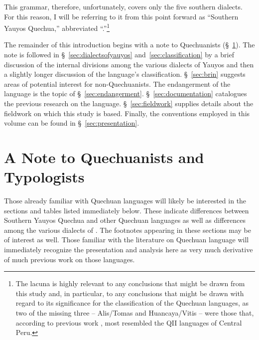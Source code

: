 This grammar, therefore, unfortunately, covers only the five southern dialects. For this reason, I will be referring to it from this point forward as ``Southern Yauyos Quechua,'' abbreviated ``\SYQ{}.''\footnote{The lacuna is highly relevant to any conclusions that might be drawn from this study and, in particular, to any conclusions that might be drawn with regard to its significance for the classification of the Quechuan languages, as two of the missing three -- Alis/Tomas and Huancaya/Vitis -- were those that, according to previous work \citep{Taylor94a,Taylor00}, most resembled the QII languages of Central Peru.}

The remainder of this introduction begins with a note to Quechuanists (\S~\ref{sec:notetoquechuanists}). The note is followed in \S~\ref{sec:dialectsofyauyos} and~\ref{sec:classification} by a brief discussion of the internal divisions among the various dialects of Yauyos and then a slightly longer discussion of the language's classification. \S~\ref{sec:brin} suggests areas of potential interest for non-Quechuanists. The endangerment of the language is the topic of \S~\ref{sec:endangerment}. \S~\ref{sec:documentation} catalogues the previous research on the language. \S~\ref{sec:fieldwork} supplies details about the fieldwork on which this study is based. Finally, the conventions employed in this volume can be found in \S~\ref{sec:presentation}.

\section{A Note to Quechuanists and Typologists}\label{sec:notetoquechuanists} 
Those already familiar with Quechuan languages will likely be interested in the sections and tables listed immediately below. These indicate differences between Southern Yauyos Quechua and other Quechuan languages as well as differences among the various dialects of \SYQ{}. The footnotes appearing in these sections may be of interest as well. Those familiar with the literature on Quechuan language will immediately recognize the presentation and analysis here as very much derivative of much previous work on those languages.\\

